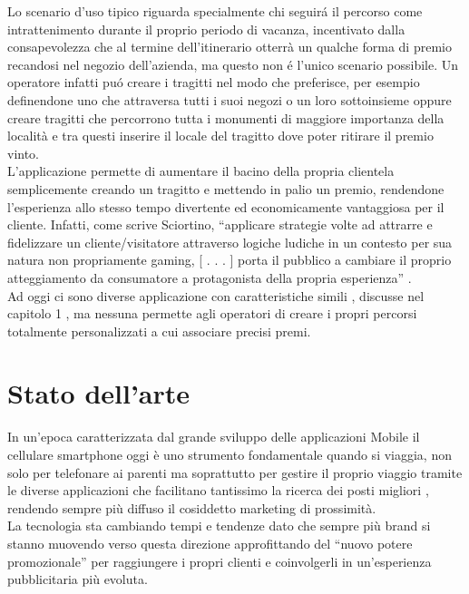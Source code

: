 Lo scenario d'uso tipico riguarda specialmente chi seguirá il percorso come intrattenimento durante il proprio periodo di vacanza, incentivato dalla consapevolezza che al termine dell’itinerario otterrà un qualche forma di premio recandosi nel negozio dell'azienda, ma questo non é l’unico scenario possibile. Un operatore infatti puó creare i tragitti nel modo che preferisce, per esempio definendone uno che attraversa tutti i suoi negozi o un loro sottoinsieme oppure creare tragitti che percorrono tutta i monumenti di maggiore importanza della località e tra questi inserire il locale del tragitto dove poter ritirare il premio vinto.\\[0.2cm]

L'applicazione permette di aumentare il bacino della propria clientela semplicemente creando un tragitto e mettendo in palio un premio, rendendone l'esperienza allo stesso tempo divertente ed economicamente vantaggiosa per il cliente. Infatti, come scrive Sciortino, “applicare strategie volte ad attrarre e fidelizzare un cliente/visitatore attraverso logiche ludiche in un contesto per sua natura non propriamente gaming, [ . . . ] porta il pubblico a cambiare il proprio atteggiamento da consumatore a protagonista della propria esperienza” \cite{rif5}.\\[0.2cm]

Ad oggi ci sono diverse applicazione con caratteristiche simili , discusse nel capitolo 1 , ma nessuna permette agli operatori di creare i propri percorsi totalmente personalizzati a cui associare precisi premi.

\renewcommand*\contentsname{Indice}
\tableofcontents

\chapter{Stato dell'arte}

In un’epoca caratterizzata dal grande sviluppo delle applicazioni Mobile il cellulare smartphone oggi è uno strumento fondamentale quando si viaggia, non solo per telefonare ai parenti ma soprattutto per gestire il proprio viaggio tramite le diverse applicazioni che facilitano tantissimo la ricerca dei posti migliori , rendendo sempre più diffuso il cosiddetto marketing di prossimità.\\

La tecnologia sta cambiando tempi e tendenze dato che sempre più brand si stanno muovendo verso questa direzione approfittando del “nuovo potere promozionale” per raggiungere i propri clienti e coinvolgerli in un’esperienza pubblicitaria più evoluta.\\

